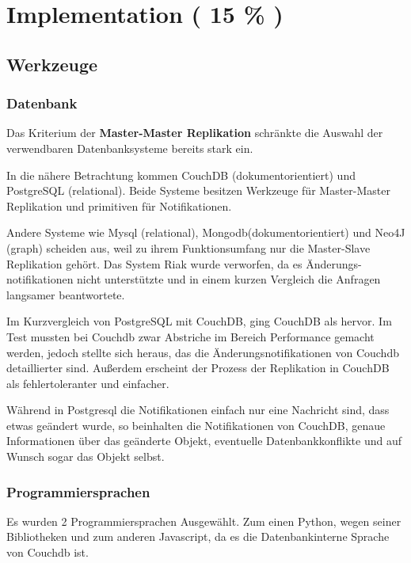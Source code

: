 \chapter{Implementation ( 15 \% ) }


\section{Werkzeuge}
\subsection{Datenbank}

Das Kriterium der \textbf{Master-Master Replikation}
schränkte die Auswahl der verwendbaren Datenbanksysteme bereits stark ein.

In die nähere Betrachtung kommen CouchDB (dokumentorientiert)
und PostgreSQL (relational).
Beide Systeme besitzen Werkzeuge f\"ur Master-Master Replikation
und primitiven für Notifikationen.

Andere Systeme wie Mysql (relational), Mongodb(dokumentorientiert)
und  Neo4J (graph) scheiden aus, weil zu ihrem Funktionsumfang
nur die Master-Slave Replikation geh\"ort.
Das System Riak wurde verworfen, da es \"Anderungs-notifikationen
nicht unterstützte und in einem kurzen Vergleich
die Anfragen langsamer beantwortete.

Im Kurzvergleich von PostgreSQL mit CouchDB,
ging CouchDB als  hervor.
Im Test mussten bei Couchdb zwar Abstriche im Bereich Performance gemacht werden,
jedoch stellte sich heraus, das die \"Anderungsnotifikationen von Couchdb detaillierter sind.
Außerdem erscheint der Prozess der Replikation in CouchDB
als fehlertoleranter und einfacher.

W\"ahrend in Postgresql die Notifikationen einfach nur eine Nachricht sind,
dass etwas ge\"andert wurde,
so beinhalten die Notifikationen von CouchDB, genaue Informationen
\"uber das ge\"anderte Objekt, eventuelle Datenbankkonflikte
und auf Wunsch sogar das Objekt selbst.

\subsection{Programmiersprachen}

Es wurden 2 Programmiersprachen Ausgew\"ahlt.
Zum einen Python, wegen seiner Bibliotheken und
zum anderen Javascript, da es die Datenbankinterne Sprache von Couchdb ist.

